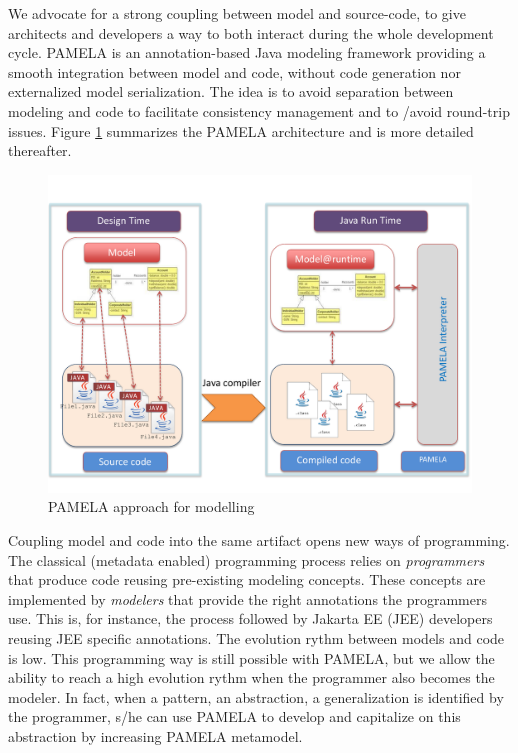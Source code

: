 We advocate for a strong coupling between model and source-code, to give architects and developers a way to both interact during the whole development cycle. PAMELA is an annotation-based Java modeling framework providing a smooth integration between model and code, without code generation nor externalized model serialization.  The idea is to avoid separation between modeling and code to facilitate consistency management and to /avoid round-trip issues. Figure \ref{fig:PamelaVision} summarizes the PAMELA architecture and is more detailed thereafter.  

\begin{figure}
    \centering
    \includegraphics[width=1.0 \columnwidth]{PamelaVisionV2.pdf}
    \caption{PAMELA approach for modelling}
    \label{fig:PamelaVision}
\end{figure}


Coupling model and code into the same artifact opens new ways of programming. The classical (metadata enabled) programming process relies on \emph{programmers} that produce code reusing pre-existing modeling concepts. These concepts are implemented by \emph{modelers} that provide the right annotations the programmers use. This is, for instance, the process followed by Jakarta EE (JEE) developers reusing JEE specific annotations. The evolution rythm between models and code is low. This programming way is still possible with PAMELA, but we allow the ability to reach a high evolution rythm when the programmer also becomes the modeler. In fact, when a pattern, an abstraction, a generalization is identified by the programmer, s/he can use PAMELA to develop and capitalize on this abstraction by increasing PAMELA metamodel. 

